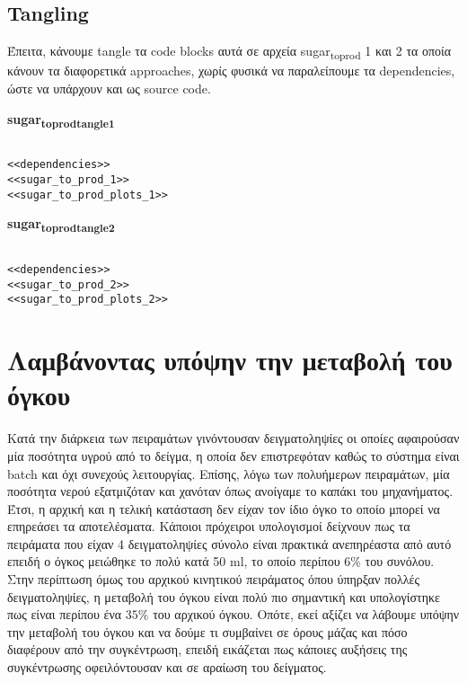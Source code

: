 \documentclass[11pt]{article}
\begin{document}
\subsection{Tangling}
\label{sec:org5519665}
Έπειτα, κάνουμε tangle τα code blocks αυτά σε αρχεία sugar\textsubscript{to}\textsubscript{prod} 1 και 2 τα οποία κάνουν τα διαφορετικά approaches, χωρίς φυσικά να παραλείπουμε τα dependencies, ώστε να υπάρχουν και ως source code.

\textbf{sugar\textsubscript{to}\textsubscript{prod}\textsubscript{tangle}\textsubscript{1}}
\begin{verbatim}

<<dependencies>>
<<sugar_to_prod_1>>
<<sugar_to_prod_plots_1>>

\end{verbatim}

\textbf{sugar\textsubscript{to}\textsubscript{prod}\textsubscript{tangle}\textsubscript{2}}
\begin{verbatim}

<<dependencies>>
<<sugar_to_prod_2>>
<<sugar_to_prod_plots_2>>

\end{verbatim}

\section{Λαμβάνοντας υπόψην την μεταβολή του όγκου}
\label{sec:org0921387}
Κατά την διάρκεια των πειραμάτων γινόντουσαν δειγματοληψίες οι οποίες αφαιρούσαν μία ποσότητα υγρού από το δείγμα, η οποία δεν επιστρεφόταν καθώς το σύστημα είναι batch και όχι συνεχούς λειτουργίας. Επίσης, λόγω των πολυήμερων πειραμάτων, μία ποσότητα νερού εξατμιζόταν και χανόταν όπως ανοίγαμε το καπάκι του μηχανήματος. Έτσι, η αρχική και η τελική κατάσταση δεν είχαν τον ίδιο όγκο το οποίο μπορεί να επηρεάσει τα αποτελέσματα. Κάποιοι πρόχειροι υπολογισμοί δείχνουν πως τα πειράματα που είχαν 4 δειγματοληψίες σύνολο είναι πρακτικά ανεπηρέαστα από αυτό επειδή ο όγκος μειώθηκε το πολύ κατά 50 ml, το οποίο περίπου \(6 \%\) του συνόλου. Στην περίπτωση όμως του αρχικού κινητικού πειράματος όπου ύπηρξαν πολλές δειγματοληψίες, η μεταβολή του όγκου είναι πολύ πιο σημαντική και υπολογίστηκε πως είναι περίπου ένα \(35 \%\) του αρχικού όγκου. Οπότε, εκεί αξίζει να λάβουμε υπόψην την μεταβολή του όγκου και να δούμε τι συμβαίνει σε όρους μάζας και πόσο διαφέρουν από την συγκέντρωση, επειδή εικάζεται πως κάποιες αυξήσεις της συγκέντρωσης οφειλόντουσαν και σε αραίωση του δείγματος.
\end{document}
